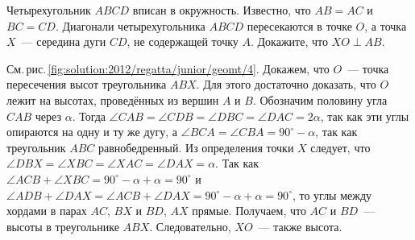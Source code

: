 \problem
Четырехугольник $ABCD$ вписан в окружность.
Известно, что $AB = AC$ и $BC = CD$.
Диагонали четырехугольника $ABCD$ пересекаются в точке $O$, а точка $X$~---
середина дуги $CD$, не содержащей точку $A$. Докажите, что $XO \perp AB$.

%
\label{solution:2012/regatta/junior/geomt/4}%
См.\,рис.\,\ref{fig:solution:2012/regatta/junior/geomt/4}.
Докажем, что $O$~--- точка пересечения высот треугольника $ABX$.
Для этого достаточно доказать, что $O$ лежит на высотах, проведённых из вершин
$A$ и $B$.
Обозначим половину угла $CAB$ через $\alpha$.
Тогда
$\angle CAB = \angle CDB = \angle DBC = \angle DAC = 2 \alpha$,
так как эти углы опираются на одну и ту же дугу, а
$\angle BCA = \angle CBA = 90^\circ - \alpha$,
так как треугольник $ABC$ равнобедренный.
Из определения точки $X$ следует, что
$\angle DBX = \angle XBC = \angle XAC = \angle DAX = \alpha$.
Так как
\(
    \angle ACB + \angle XBC
=
    90^\circ - \alpha + \alpha
=
    90^\circ
\)
и
\(
    \angle ADB + \angle DAX
=
    \angle ACB + \angle DAX
=
    90^\circ - \alpha + \alpha
=
    90^\circ
\),
то углы между хордами в парах $AC$, $BX$ и $BD$, $AX$ прямые.
Получаем, что $AC$ и $BD$~--- высоты в треугольнике $ABX$.
Следовательно, $XO$~--- также высота.

\endproblem

